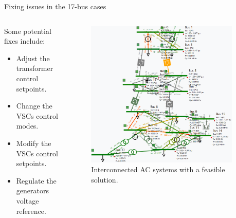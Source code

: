 \begin{frame}{Fixing issues in the 17-bus cases}
    \begin{columns}
        
        \begin{column}{0.49\textwidth}
            Some potential fixes include:
            \begin{itemize}
                \item Adjust the transformer control setpoints.
                \item Change the VSCs control modes.
                \item Modify the VSCs control setpoints.
                \item Regulate the generators voltage reference.
            \end{itemize}
        \end{column}

        \begin{column}{0.5\textwidth}
            \begin{figure}[H]
                \centering
            \includegraphics[width=0.93\textwidth]{Images/17bus_solved.png}
            \caption{Interconnected AC systems with a feasible solution.}
            \label{fig:17bus3}
            \end{figure}
        \end{column}
    \end{columns}
\end{frame}

